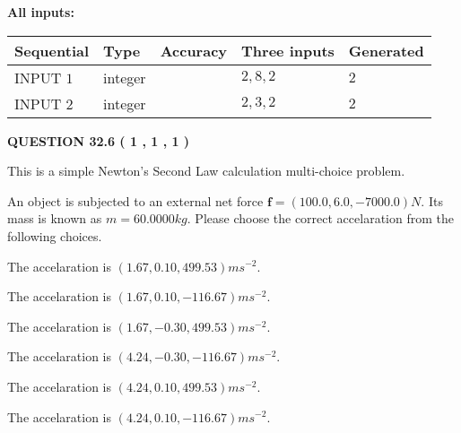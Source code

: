 \documentclass[12pt]{article}
\begin{document}
   
   
   
\noindent\vspace{0.1in}\hspace{-0.08in} {\textbf{\Large{All inputs: }}}
   
   
  
  
\noindent\begin{tabular}{|l|l|l|l|l|}
\hline
 Sequential & Type & Accuracy & Three inputs & Generated \\ 
\hline
 
 
  INPUT $            1 $ & integer &  & $
 2
 , 
 8
 , 
 2
 $ & $ 2 $ 
 \\  \hline  
 
 
  INPUT $            2 $ & integer &  & $
 2
 , 
 3
 , 
 2
 $ & $ 2 $ 
 \\  \hline  
 \end{tabular}
   
   
  
\vspace{0.2in}
  
{\textbf{\Large{QUESTION
32.6 
 (           1 ,           1 ,           1 )
}}}
  
  


\noindent{}
This is a simple Newton's Second Law calculation multi-choice problem.  
\noindent{}


 
 
An object is subjected to an external net force $\mathbf{f}=
(100.0 , 6.0 , -7000.0) N$.
Its mass is known as $m= %
60.0000 kg$. Please choose the
correct accelaration from the following choices.
 
 
 
The accelaration is $  %
(
1.67,
0.10,
499.53)
ms^{-2} $.
 
 
The accelaration is $  %
(
1.67,
0.10,
-116.67)
ms^{-2} $.
 
 
The accelaration is $  %
(
1.67,
-0.30,
499.53)
ms^{-2} $.
 
 
The accelaration is $  %
(
4.24,
-0.30,
-116.67)
ms^{-2} $.
 
 
The accelaration is $  %
(
4.24,
0.10,
499.53)
ms^{-2} $.
 
 
The accelaration is $  %
(
4.24,
0.10,
-116.67)
ms^{-2} $.
 
\end{document}
